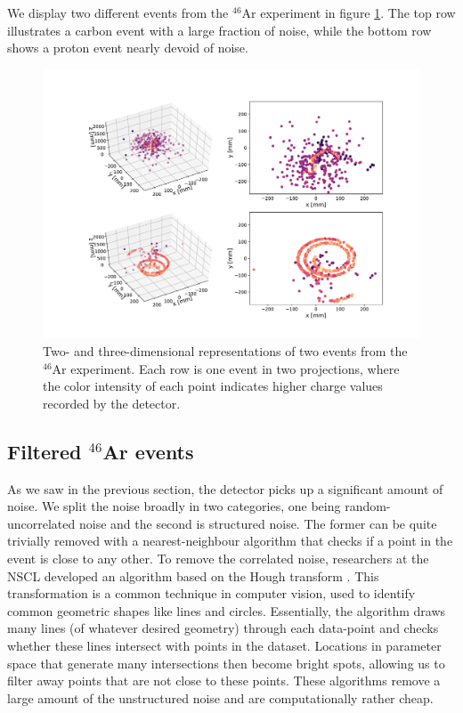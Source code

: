 \documentclass[review,number,sort&compress]{elsarticle}
\begin{document}
We display two different events from the ${}^{46}$Ar experiment in figure \ref{fig:samples}. The top row illustrates a carbon event with a large fraction of noise, while the bottom row shows a proton event nearly devoid of noise.

\begin{figure}[ht]
\centering
\includegraphics[width=\textwidth]{plots/display_eventsfull_.pdf}
\caption[Displaying un-filtered events in 2D and 3D]{Two- and three-dimensional representations of two events from the ${}^{46}$Ar experiment. Each row is one event in two projections, where the color intensity of each point indicates higher charge values recorded by the detector.}\label{fig:samples}
\end{figure}

\subsection{Filtered \texorpdfstring{${}^{46}$Ar}{46Ar} events}\label{sec:filtered}


As we saw in the previous section, the detector picks up a significant amount of noise. We split the noise broadly in two categories,  one being random-uncorrelated noise and the second is structured noise. The former can be quite trivially removed with a nearest-neighbour algorithm that checks if a point in the event is close to any other. To remove the correlated noise, researchers at the NSCL developed an algorithm based on the Hough transform \cite{Newman1972}. This transformation is a common technique in computer vision, used to identify common geometric shapes like lines and circles. Essentially, the algorithm draws many lines (of whatever desired geometry) through each data-point and checks whether these lines intersect with points in the dataset. Locations in parameter space that generate many intersections then become bright spots, allowing us to filter away points that are not close to these points. These algorithms remove a large amount of the unstructured noise and are computationally rather cheap. 
\end{document}
